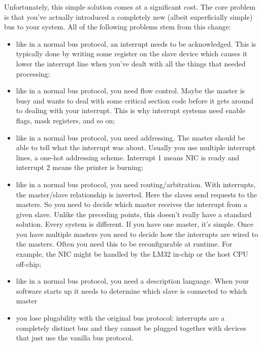 \documentclass[a4paper, 12pt]{article}
\begin{document}
Unfortunately, this simple solution comes at a significant cost. The
core problem is that you've actually introduced a completely new (albeit
superficially simple) bus to your system. All of the following problems
stem from this  change:

\begin{itemize}
\item like in a normal bus protocol, an interrupt needs to be
acknowledged. This is typically done by writing some register on the
slave device which causes it lower the interrupt line when you've dealt
with all the things that needed processing;

\item like in a normal bus protocol, you need flow control. Maybe the
master is busy and wants to deal with some critical section code before
it gets around to dealing with your interrupt. This is why interrupt
systems need enable flags, mask registers, and so on;

\item like in a normal bus protocol, you need addressing. The master
should be able to tell what the interrupt was about. Usually you use
multiple interrupt lines, a one-hot addressing scheme. Interrupt 1 means
NIC is ready and interrupt 2 means the printer is burning;

\item like in a normal bus protocol, you need routing/arbitration.
With interrupts, the master/slave relationship is inverted. Here the
slaves send requests to the masters. So you need to decide which master
receives the interrupt from a given slave. Unlike the preceding points,
this doesn't really have a standard solution. Every system is different.
If you have one master, it's simple. Once you have multiple masters you
need to decide how the interrupts are wired to the masters. Often you
need this to be reconfigurable at runtime. For example, the NIC might be
handled by the LM32 in-chip or the host CPU off-chip;

\item like in a normal bus protocol, you need a description language.
When your software starts up it needs to determine which slave is
connected to which master

\item you lose plugability with the original bus protocol: interrupts
are a completely distinct bus and they cannot be plugged together with
devices that just use the vanilla bus protocol.
\end{itemize}
\end{document}
